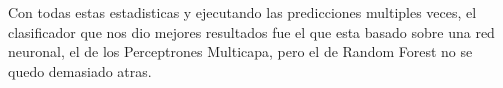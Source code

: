 \documentclass[journal]{IEEEtran}
\begin{document}
Con todas estas estadisticas y ejecutando las predicciones multiples veces, el clasificador que nos dio mejores resultados fue el que esta basado sobre una red neuronal, el de los Perceptrones Multicapa, pero el de Random Forest no se quedo demasiado atras.


%
%



%
%
\end{document}
